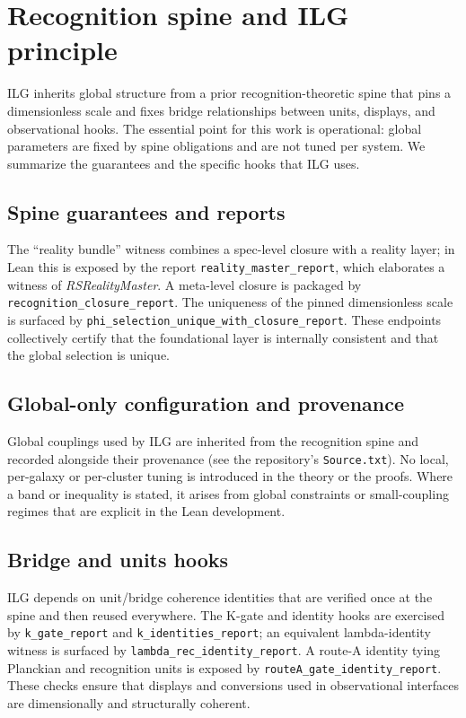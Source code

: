 \documentclass[aps,prd,twocolumn,superscriptaddress,nofootinbib,floatfix,longbibliography]{revtex4-2}
\newcommand{\lean}[1]{\texttt{#1}}
\begin{document}
\section{Recognition spine and ILG principle}\label{sec:context}

ILG inherits global structure from a prior recognition-theoretic spine that pins a dimensionless scale and fixes bridge relationships between units, displays, and observational hooks. The essential point for this work is operational: global parameters are fixed by spine obligations and are not tuned per system. We summarize the guarantees and the specific hooks that ILG uses.

\subsection{Spine guarantees and reports}
The ``reality bundle'' witness combines a spec-level closure with a reality layer; in Lean this is exposed by the report
\lean{reality_master_report}, which elaborates a witness of \emph{RSRealityMaster}. A meta-level closure is packaged by \lean{recognition_closure_report}. The uniqueness of the pinned dimensionless scale is surfaced by \lean{phi_selection_unique_with_closure_report}. These endpoints collectively certify that the foundational layer is internally consistent and that the global selection is unique.

\subsection{Global-only configuration and provenance}
Global couplings used by ILG are inherited from the recognition spine and recorded alongside their provenance (see the repository's \texttt{Source.txt}). No local, per-galaxy or per-cluster tuning is introduced in the theory or the proofs. Where a band or inequality is stated, it arises from global constraints or small-coupling regimes that are explicit in the Lean development.

\subsection{Bridge and units hooks}
ILG depends on unit/bridge coherence identities that are verified once at the spine and then reused everywhere. The K-gate and identity hooks are exercised by \lean{k_gate_report} and \lean{k_identities_report}; an equivalent lambda-identity witness is surfaced by \lean{lambda_rec_identity_report}. A route-A identity tying Planckian and recognition units is exposed by \lean{routeA_gate_identity_report}. These checks ensure that displays and conversions used in observational interfaces are dimensionally and structurally coherent.
\end{document}
